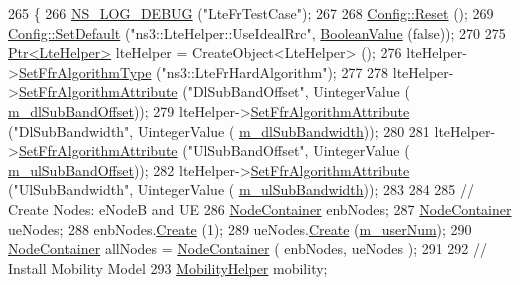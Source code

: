 \begin{DoxyCode}
265 \{
266   \hyperlink{group__logging_ga413f1886406d49f59a6a0a89b77b4d0a}{NS\_LOG\_DEBUG} (\textcolor{stringliteral}{"LteFrTestCase"});
267 
268   \hyperlink{group__config_ga2c1b65724f42f8c72276d7e7ad6df6db}{Config::Reset} ();
269   \hyperlink{group__config_ga2e7882df849d8ba4aaad31c934c40c06}{Config::SetDefault} (\textcolor{stringliteral}{"ns3::LteHelper::UseIdealRrc"}, 
      \hyperlink{classns3_1_1BooleanValue}{BooleanValue} (\textcolor{keyword}{false}));
270 
275   \hyperlink{classns3_1_1Ptr}{Ptr<LteHelper>} lteHelper = CreateObject<LteHelper> ();
276   lteHelper->\hyperlink{classns3_1_1LteHelper_a035c6b03305c1511975362f80425b5fc}{SetFfrAlgorithmType} (\textcolor{stringliteral}{"ns3::LteFrHardAlgorithm"});
277 
278   lteHelper->\hyperlink{classns3_1_1LteHelper_a793d56e843a844428851e90752c5f130}{SetFfrAlgorithmAttribute} (\textcolor{stringliteral}{"DlSubBandOffset"}, UintegerValue (
      \hyperlink{classLteHardFrTestCase_a337571f3387698d9b8dba81858ea1dec}{m\_dlSubBandOffset}));
279   lteHelper->\hyperlink{classns3_1_1LteHelper_a793d56e843a844428851e90752c5f130}{SetFfrAlgorithmAttribute} (\textcolor{stringliteral}{"DlSubBandwidth"}, UintegerValue (
      \hyperlink{classLteHardFrTestCase_a6e76310d5e2f2fbb3252b425f66ebd0d}{m\_dlSubBandwidth}));
280 
281   lteHelper->\hyperlink{classns3_1_1LteHelper_a793d56e843a844428851e90752c5f130}{SetFfrAlgorithmAttribute} (\textcolor{stringliteral}{"UlSubBandOffset"}, UintegerValue (
      \hyperlink{classLteHardFrTestCase_a5855d83febfdbf617cc86a8acaa97504}{m\_ulSubBandOffset}));
282   lteHelper->\hyperlink{classns3_1_1LteHelper_a793d56e843a844428851e90752c5f130}{SetFfrAlgorithmAttribute} (\textcolor{stringliteral}{"UlSubBandwidth"}, UintegerValue (
      \hyperlink{classLteHardFrTestCase_a466dbdebec3cfdf98011aa4a5de0ad08}{m\_ulSubBandwidth}));
283 
284 
285   \textcolor{comment}{// Create Nodes: eNodeB and UE}
286   \hyperlink{classns3_1_1NodeContainer}{NodeContainer} enbNodes;
287   \hyperlink{classns3_1_1NodeContainer}{NodeContainer} ueNodes;
288   enbNodes.\hyperlink{classns3_1_1NodeContainer_a787f059e2813e8b951cc6914d11dfe69}{Create} (1);
289   ueNodes.\hyperlink{classns3_1_1NodeContainer_a787f059e2813e8b951cc6914d11dfe69}{Create} (\hyperlink{classLteFrTestCase_a0fd46ca7afd0126775b0dfe0e082d634}{m\_userNum});
290   \hyperlink{classns3_1_1NodeContainer}{NodeContainer} allNodes = \hyperlink{classns3_1_1NodeContainer}{NodeContainer} ( enbNodes, ueNodes );
291 
292   \textcolor{comment}{// Install Mobility Model}
293   \hyperlink{classns3_1_1MobilityHelper}{MobilityHelper} mobility;

\end{DoxyCode}
